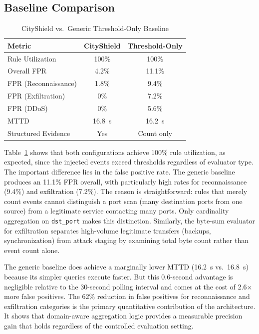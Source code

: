 \documentclass[conference,10pt]{IEEEtran}
\begin{document}
\subsection{Baseline Comparison}
\label{subsec:baseline}

\begin{table}[h]
\centering
\caption{CityShield vs.\ Generic Threshold-Only Baseline}
\label{tab:baseline}
\begin{tabular}{l c c}
\toprule
\textbf{Metric} & \textbf{CityShield} & \textbf{Threshold-Only} \\
\midrule
Rule Utilization & 100\% & 100\% \\
Overall FPR & 4.2\% & 11.1\% \\
FPR (Reconnaissance) & 1.8\% & 9.4\% \\
FPR (Exfiltration) & 0\% & 7.2\% \\
FPR (DDoS) & 0\% & 5.6\% \\
MTTD & 16.8~s & 16.2~s \\
Structured Evidence & Yes & Count only \\
\bottomrule
\end{tabular}
\end{table}

Table~\ref{tab:baseline} shows that both configurations achieve 100\% rule utilization, as expected, since the injected events exceed thresholds regardless of evaluator type. The important difference lies in the false positive rate. The generic baseline produces an 11.1\% FPR overall, with particularly high rates for reconnaissance (9.4\%) and exfiltration (7.2\%). The reason is straightforward: rules that merely count events cannot distinguish a port scan (many destination ports from one source) from a legitimate service contacting many ports. Only cardinality aggregation on \texttt{dst\_port} makes this distinction. Similarly, the byte-sum evaluator for exfiltration separates high-volume legitimate transfers (backups, synchronization) from attack staging by examining total byte count rather than event count alone.

The generic baseline does achieve a marginally lower MTTD (16.2~s vs.\ 16.8~s) because its simpler queries execute faster. But this 0.6-second advantage is negligible relative to the 30-second polling interval and comes at the cost of 2.6$\times$ more false positives. The 62\% reduction in false positives for reconnaissance and exfiltration categories is the primary quantitative contribution of the architecture. It shows that domain-aware aggregation logic provides a measurable precision gain that holds regardless of the controlled evaluation setting.
\end{document}
